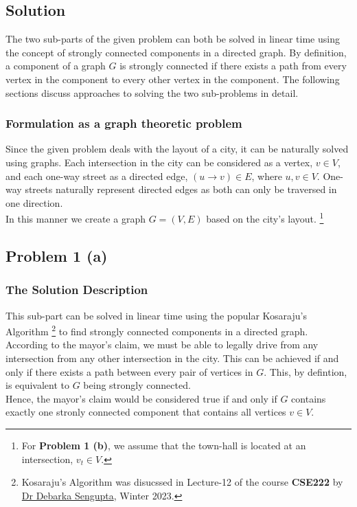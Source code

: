 \documentclass[12pt]{report}
\begin{document}
    \subsection*{Solution}
    The two sub-parts of the given problem can both be solved in linear time using the concept of strongly connected components in a directed graph.
    By definition, a component of a graph $G$ is strongly connected if there exists a path from every vertex in the component to every other vertex in the component.
    The following sections discuss approaches to solving the two sub-problems in detail.

    \subsubsection*{Formulation as a graph theoretic problem}
    Since the given problem deals with the layout of a city, it can be naturally solved using graphs.
    Each intersection in the city can be considered as a vertex, $v \in V$, and each one-way street as a directed edge, $(u \to v) \in E$, where $u, v \in V$.
    One-way streets naturally represent directed edges as both can only be traversed in one direction. \\
    In this manner we create a graph $G = (V, E)$ based on the city's layout.
    \footnote{For \textbf{Problem 1 (b)}, we assume that the town-hall is located at an intersection, $v_{t} \in V$.}

    \subsection*{Problem 1 (a)}
    \subsubsection*{The Solution Description}
    This sub-part can be solved in linear time using the popular Kosaraju's Algorithm
    \footnote{
        Kosaraju's Algorithm was disucssed in Lecture-12 of the course \textbf{CSE222} by \href{mailto:debarka@iiitd.ac.in}{Dr Debarka Sengupta}, Winter 2023.
    } to find strongly connected components in a directed graph.
    According to the mayor's claim, we must be able to legally drive from any intersection from any other intersection in the city.
    This can be achieved if and only if there exists a path between every pair of vertices in $G$.
    This, by defintion, is equivalent to $G$ being strongly connected. \\
    Hence, the mayor's claim would be considered true if and only if $G$ contains exactly one stronly connected component that contains all vertices $v \in V$.
\end{document}
